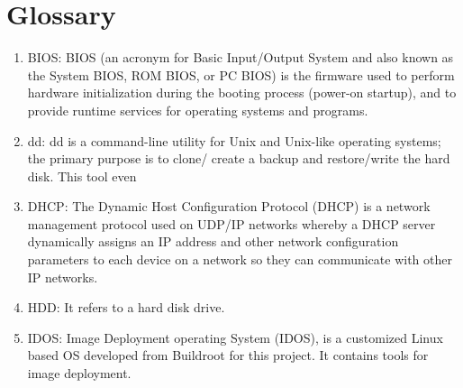 \documentclass[a4paper,12pt]{article}
\begin{document}
\section{\fontsize{16pt}{1em} Glossary}
\begin{enumerate}
       \item BIOS: BIOS (an acronym for Basic Input/Output System and also known as the System BIOS, ROM BIOS, or PC BIOS) is the firmware used to perform hardware initialization during the booting process (power-on startup), and to provide runtime services for operating systems and programs.
    \item dd: dd is a command-line utility for Unix and Unix-like operating systems; the primary purpose is to clone/ create a backup and restore/write the hard disk. This tool even
    \item DHCP: The Dynamic Host Configuration Protocol (DHCP) is a network management protocol used on UDP/IP networks whereby a DHCP server dynamically assigns an IP address and other network configuration parameters to each device on a network so they can communicate with other IP networks.
    \item HDD: It refers to a hard disk drive.
    \item IDOS: Image Deployment operating System (IDOS), is a customized Linux based OS developed from Buildroot for this project. It contains tools for image deployment.
  

\end{enumerate}
\end{document}
